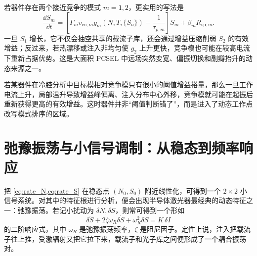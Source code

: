 若器件存在两个接近竞争的模式 $m=1,2$，更实用的写法是
\begin{equation}
\frac{\dd S_m}{\dd t}
=
\left[\Gamma_m v_{\mathrm{en},m} g_m(N,T,\{S_n\})-\frac{1}{\tau_{p,m}}\right]S_m
+ \beta_m R_{\mathrm{sp},m}.
\label{eq:multimode_rate}
\end{equation}
一旦 $S_1$ 增长，它不仅会抽空共享的载流子库，还会通过增益压缩削弱 $S_2$ 的有效增益；反过来，若热漂移或注入非均匀使 $g_2$ 上升更快，竞争模也可能在较高电流下重新占据优势。这是大面积 PCSEL 中远场突然变宽、偏振切换和副瓣抬升的动态来源之一。

若某器件在冷腔分析中目标模相对竞争模只有很小的阈值增益裕量，那么一旦工作电流上升，局部温升导致增益峰偏离、注入分布中心外移，竞争模就可能在起振后重新获得更高的有效增益。这时器件并非“阈值判断错了”，而是进入了动态工作点改写模式排序的区域。

\section{弛豫振荡与小信号调制：从稳态到频率响应}
把 \cref{eq:rate_N,eq:rate_S} 在稳态点 $(N_0,S_0)$ 附近线性化，可得到一个 $2\times 2$ 小信号系统。对其中的特征根进行分析，便会出现半导体激光器最经典的动态特征之一：弛豫振荡。若记小扰动为 $\delta N,\delta S$，则常可得到一个形如
\begin{equation}
\delta \ddot S + 2\zeta\omega_R \delta \dot S + \omega_R^2 \delta S = K\,\delta I
\label{eq:relaxation_form}
\end{equation}
的二阶响应式，其中 $\omega_R$ 是弛豫振荡频率，$\zeta$ 是阻尼因子。定性上说，注入把载流子往上推，受激辐射又把它拉下来，载流子和光子库之间便形成了一个耦合振荡对。

